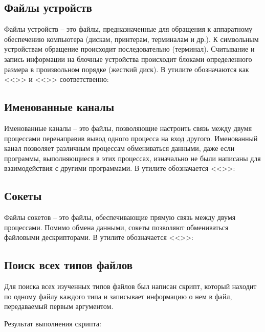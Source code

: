 \subsection{Файлы устройств}

Файлы устройств -- это файлы, предназначенные для обращения к аппаратному обеспечению компьютера (дискам, принтерам, терминалам и др.). К символьным устройствам обращение происходит последовательно (терминал).
Считывание и запись информации на блочные устройства происходит блоками определенного размера в произвольном порядке (жесткий диск). В утилите  обозначаются как <<>> и <<>> соответственно:



\subsection{Именованные каналы}

Именованные каналы -- это файлы, позволяющие настроить связь между двумя процессами перенаправив вывод одного процесса на вход другого. Именованный канал позволяет различным процессам обмениваться данными, даже если программы, выполняющиеся в этих процессах, изначально не были написаны для взаимодействия с другими программами. В утилите  обозначается <<>>:


\subsection{Сокеты}

Файлы сокетов -- это файлы, обеспечивающие прямую связь между двумя процессами. Помимо обмена данными, сокеты позволяют обмениваться файловыми дескрипторами. В утилите  обозначается <<>>:


\subsection{Поиск всех типов файлов}

Для поиска всех изученных типов файлов был написан скрипт, который находит по одному файлу каждого типа и записывает информацию о нем в файл, передаваемый первым аргументом.


Результат выполнения скрипта:


